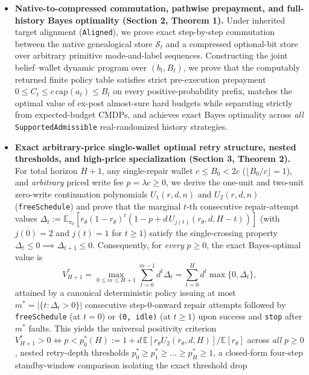 \documentclass[11pt,a4paper]{article}
\providecommand{\tightlist}{\setlength{\itemsep}{2pt}\setlength{\parskip}{0pt}}
\begin{document}
\begin{itemize}
\tightlist
\item
  \textbf{Native-to-compressed commutation, pathwise prepayment, and
  full-history Bayes optimality (Section 2, Theorem 1).} Under inherited
  target alignment (\texttt{Aligned}), we prove exact step-by-step
  commutation between the native genealogical store \(\mathcal{S}_t\)
  and a compressed optional-bit store over arbitrary primitive
  mode-and-label sequences. Constructing the joint belief--wallet
  dynamic program over \((b_t, B_t)\), we prove that the computably
  returned finite policy table satisfies strict pre-execution prepayment
  \(0 \le C_t \le c\,\mathrm{cap}(a_t) \le B_t\) on every
  positive-probability prefix, matches the optimal value of ex-post
  almost-sure hard budgets while separating strictly from
  expected-budget CMDPs, and achieves exact Bayes optimality across
  \emph{all} \texttt{SupportedAdmissible} real-randomized history
  strategies.
\item
  \textbf{Exact arbitrary-price single-wallet optimal retry structure,
  nested thresholds, and high-price specialization (Section 3, Theorem
  2).} For total horizon \(H+1\), any single-repair wallet
  \(c \le B_0 < 2c\) (\(\lfloor B_0/c\rfloor = 1\)), and
  \emph{arbitrary} priced write fee \(p = \lambda c \ge 0\), we derive
  the one-unit and two-unit zero-write continuation polynomials
  \(U_1(r,d,n)\) and \(U_2(r,d,n)\) (\texttt{freeSchedule}) and prove
  that the marginal \(t\)-th consecutive repair-attempt values
  \(\Delta_t := \mathbb{E}_{\pi_0}[r_\theta(1-r_\theta)^t(1 - p + d\,U_{j(t)}(r_\theta, d, H-t))]\)
  (with \(j(0)=2\) and \(j(t)=1\) for \(t \ge 1\)) satisfy the
  single-crossing property
  \(\Delta_t \le 0 \implies \Delta_{t+1} \le 0\). Consequently, for
  \emph{every} \(p \ge 0\), the exact Bayes-optimal value is
  \[V_{H+1}^* = \max_{0 \le m \le H+1} \sum_{t=0}^{m-1} d^t \Delta_t = \sum_{t=0}^{H} d^t \max\{0, \Delta_t\},\]
  attained by a canonical deterministic policy issuing at most
  \(m^* = |\{t : \Delta_t > 0\}|\) consecutive step-\(0\)-onward repair
  attempts followed by \texttt{freeSchedule} (at \(t=0\)) or
  \texttt{(0,\ idle)} (at \(t \ge 1\)) upon success and \texttt{stop}
  after \(m^*\) faults. This yields the universal positivity criterion
  \(V_{H+1}^* > 0 \iff p < p_0^*(H) := 1 + d\,\mathbb{E}[r_\theta U_2(r_\theta, d, H)]/\mathbb{E}[r_\theta]\)
  across \emph{all} \(p \ge 0\), nested retry-depth thresholds
  \(p_0^* \ge p_1^* \ge \dots \ge p_H^* \ge 1\), a closed-form four-step
  standby-window comparison isolating the exact threshold drop

\end{itemize}
\end{document}
